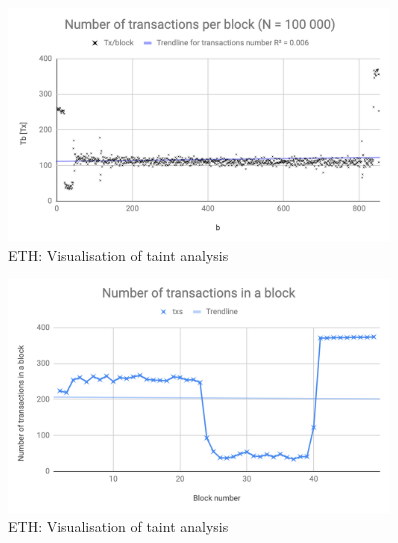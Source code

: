 \begin{figure}[h]
    \centering
    \includegraphics[width=0.9\textwidth]{img/txmed.png}
    \caption{ETH: Visualisation of taint analysis}
    \label{fig:txbig}
\end{figure}

\begin{figure}[h]
    \centering
    \includegraphics[width=0.9\textwidth]{img/TxNumperBlockSmall.png}
    \caption{ETH: Visualisation of taint analysis}
    \label{fig:txsmall}
\end{figure}
